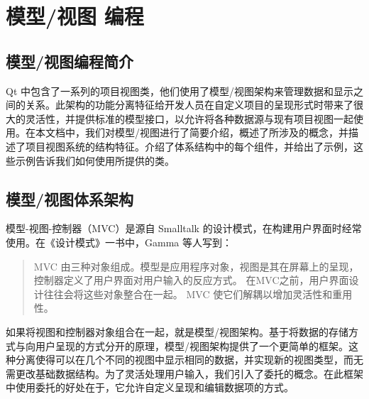 \chapter{模型/视图 编程}

\section{模型/视图编程简介} 

Qt 中包含了一系列的项目视图类，他们使用了模型/视图架构来管理数据和显示之间的关系。此架构的功能分离特征给开发人员在自定义项目的呈现形式时带来了很大的灵活性，并提供标准的模型接口，以允许将各种数据源与现有项目视图一起使用。在本文档中，我们对模型/视图进行了简要介绍，概述了所涉及的概念，并描述了项目视图系统的结构特征。介绍了体系结构中的每个组件，并给出了示例，这些示例告诉我们如何使用所提供的类。


\section{模型/视图体系架构}

模型-视图-控制器（MVC）是源自 Smalltalk 的设计模式，在构建用户界面时经常使用。在《设计模式》一书中，Gamma 等人写到：


\begin{quote}
MVC 由三种对象组成。模型是应用程序对象，视图是其在屏幕上的呈现，控制器定义了用户界面对用户输入的反应方式。 在MVC之前，用户界面设计往往会将这些对象整合在一起。 MVC 使它们解耦以增加灵活性和重用性。	
\end{quote}

如果将视图和控制器对象组合在一起，就是模型/视图架构。基于将数据的存储方式与向用户呈现的方式分开的原理，模型/视图架构提供了一个更简单的框架。这种分离使得可以在几个不同的视图中显示相同的数据，并实现新的视图类型，而无需更改基础数据结构。为了灵活处理用户输入，我们引入了委托的概念。在此框架中使用委托的好处在于，它允许自定义呈现和编辑数据项的方式。

%
%
%
%
%


